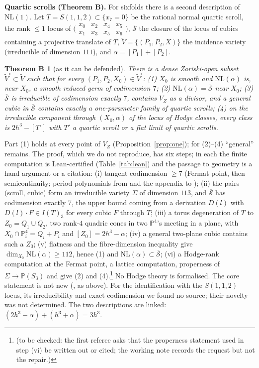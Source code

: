 \documentclass[10pt]{article}
\numberwithin{equation}{section}
\newtheorem*{thmB}{Theorem B}
\theoremstyle{remark}
\newcommand{\PP}{\mathbb{P}}
\newcommand{\NL}{\mathrm{NL}}
\newcommand{\VZ}{V_Z}
\newcommand{\tbc}[1]{\footnote{(to be checked: #1)}}
\newcommand{\run}[1]{\medskip\noindent\textbf{#1}}
\begin{document}
\run{Quartic scrolls (Theorem B).} For sixfolds there is a second description of $\NL(1)$. Let
$T=S(1,1,2)\subset\{x_7=0\}$ be the rational normal quartic scroll, the rank $\le1$ locus of
$\bigl(\begin{smallmatrix}x_0&x_2&x_4&x_5\\x_1&x_3&x_5&x_6\end{smallmatrix}\bigr)$, $\overline{\mathcal S}$ the
closure of the locus of cubics containing a projective translate of $T$, $\widetilde V=\{(P_1,P_2,X)\}$ the
incidence variety (irreducible of dimension $111$), and $\alpha=[P_1]+[P_2]$.

\begin{thmB}[as it can be defended]
There is a dense Zariski-open subset $\widetilde V^\circ\subset\widetilde V$ such that for every
$(P_1,P_2,X_0)\in\widetilde V^\circ$:
\textup{(1)} $X_0$ is smooth and $\NL(\alpha)$ is, near $X_0$, a smooth reduced germ of codimension $7$;
\textup{(2)} $\NL(\alpha)=\overline{\mathcal S}$ near $X_0$;
\textup{(3)} $\overline{\mathcal S}$ is irreducible of codimension exactly $7$, contains $\VZ$ as a divisor, and
a general cubic in $\overline{\mathcal S}$ contains exactly a one-parameter family of quartic scrolls;
\textup{(4)} on the irreducible component through $(X_0,\alpha)$ of the locus of Hodge classes, every class is
$2h^3-[T']$ with $T'$ a quartic scroll or a flat limit of quartic scrolls.
\end{thmB}
Part (1) holds at every point of $\VZ$ (Proposition~\ref{prop:one}); for (2)--(4) ``general'' remains.
The proof, which we do not reproduce, has six steps; in each the finite computation is Lean-certified
(Table~\ref{tab:lean}) and the passage to geometry is a hand argument or a citation: (i) tangent codimension
$\ge7$ (Fermat point, then semicontinuity; period polynomials from \cite{VL} and the appendix to \cite{Mo1});
(ii) the pairs (scroll, cubic) form an irreducible variety $\Sigma$ of dimension $113$, and
$\overline{\mathcal S}$ has codimension exactly $7$, the upper bound coming from a derivation $D(l)$ with
$D(l)\cdot F\in I(T)_3$ for every cubic $F$ through $T$; (iii) a torus degeneration of $T$ to $Z_0=Q_1\cup Q_2$,
two rank-$4$ quadric cones in two $\PP^4$'s meeting in a plane, with $X_0\cap\PP^4_i=Q_i+P_i$ and
$[Z_0]=2h^3-\alpha$; (iv) a general two-plane cubic contains such a $Z_0$; (v) flatness and the fibre-dimension
inequality give $\dim_{X_0}\NL(\alpha)\ge112$, hence (1) and $\NL(\alpha)\subset\overline{\mathcal S}$;
(vi) a Hodge-rank computation at the Fermat point, a lattice computation, properness of
$\Sigma\to\PP(S_3)$ and \cite{CDK} give (2) and (4).\tbc{the first referee asks that the properness statement
used in step (vi) be written out or cited; the working note records the request but not the repair.}
No Hodge theory is formalised. The core statement is not new (\cite{Kl1}, as above). For
the identification with the $S(1,1,2)$ locus, its irreducibility and exact codimension we found no source; their
novelty was not determined.
The two descriptions are linked: $(2h^3-\alpha)+(h^3+\alpha)=3h^3$.
\end{document}
